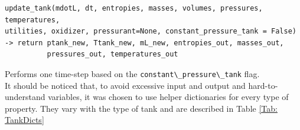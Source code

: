 \begin{verbatim}
update_tank(mdotL, dt, entropies, masses, volumes, pressures, temperatures,
utilities, oxidizer, pressurant=None, constant_pressure_tank = False)
-> return ptank_new, Ttank_new, mL_new, entropies_out, masses_out, 
		  pressures_out, temperatures_out
\end{verbatim}
\hspace*{2em} Performs one time-step based on the \verb|constant\_pressure\_tank| flag.\\
It should be noticed that, to avoid excessive input and output and hard-to-understand variables, it was chosen to use helper dictionaries for every type of property. They vary with the type of tank and are described in Table \ref{Tab: TankDicts}\\
\begin{table}[h!]
\centering
{}
\end{table}
